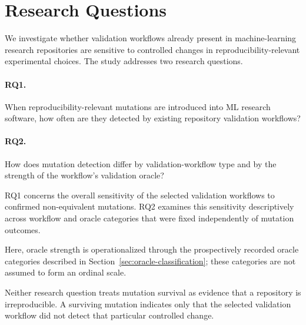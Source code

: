 \section{Research Questions}
\label{sec:research-questions}

We investigate whether validation workflows already present in
machine-learning research repositories are sensitive to controlled changes in
reproducibility-relevant experimental choices. The study addresses two
research questions.

\paragraph{RQ1.}
When reproducibility-relevant mutations are introduced into ML research
software, how often are they detected by existing repository validation
workflows?

\paragraph{RQ2.}
How does mutation detection differ by validation-workflow type and by the
strength of the workflow's validation oracle?

RQ1 concerns the overall sensitivity of the selected validation workflows to
confirmed non-equivalent mutations. RQ2 examines this sensitivity
descriptively across workflow and oracle categories that were fixed
independently of mutation outcomes.

Here, oracle strength is operationalized through the prospectively recorded
oracle categories described in Section~\ref{sec:oracle-classification}; these
categories are not assumed to form an ordinal scale.

Neither research question treats mutation survival as evidence that a
repository is irreproducible. A surviving mutation indicates only that the
selected validation workflow did not detect that particular controlled change.
